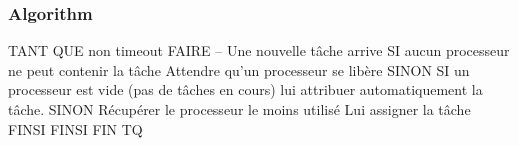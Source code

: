 \subsubsection*{Algorithm}

\begin{DoxyVerb}TANT QUE non timeout FAIRE
    -- Une nouvelle tâche arrive
    SI aucun processeur ne peut contenir la tâche
        Attendre qu'un processeur se libère
    SINON
        SI un processeur est vide (pas de tâches en cours)
            lui attribuer automatiquement la tâche.
        SINON
            Récupérer le processeur le moins utilisé
            Lui assigner la tâche
        FINSI
    FINSI
FIN TQ \end{DoxyVerb}
 
